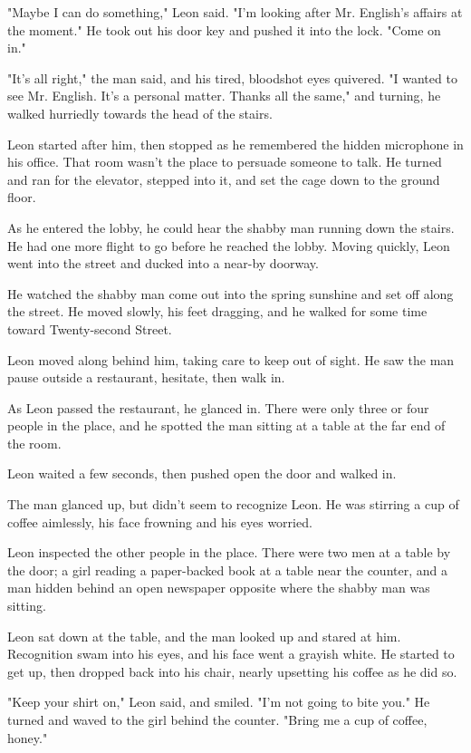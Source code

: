 \documentclass{novel}
\begin{document}
"Maybe I can do something," Leon said. "I'm looking after Mr. English's affairs at the moment." He took out his door key and pushed it into the lock. "Come on in."

"It's all right," the man said, and his tired, bloodshot eyes quivered. "I wanted to see Mr. English. It's a personal matter. Thanks all the same," and turning, he walked hurriedly towards the head of the stairs.

Leon started after him, then stopped as he remembered the hidden microphone in his office. That room wasn't the place to persuade someone to talk. He turned and ran for the elevator, stepped into it, and set the cage down to the ground floor.

As he entered the lobby, he could hear the shabby man running down the stairs. He had one more flight to go before he reached the lobby. Moving quickly, Leon went into the street and ducked into a near-by doorway.

He watched the shabby man come out into the spring sunshine and set off along the street. He moved slowly, his feet dragging, and he walked for some time toward Twenty-second Street.

Leon moved along behind him, taking care to keep out of sight. He saw the man pause outside a restaurant, hesitate, then walk in.

As Leon passed the restaurant, he glanced in. There were only three or four people in the place, and he spotted the man sitting at a table at the far end of the room.

Leon waited a few seconds, then pushed open the door and walked in.

The man glanced up, but didn't seem to recognize Leon. He was stirring a cup of coffee aimlessly, his face frowning and his eyes worried.

Leon inspected the other people in the place. There were two men at a table by the door; a girl reading a paper-backed book at a table near the counter, and a man hidden behind an open newspaper opposite where the shabby man was sitting.

Leon sat down at the table, and the man looked up and stared at him. Recognition swam into his eyes, and his face went a grayish white. He started to get up, then dropped back into his chair, nearly upsetting his coffee as he did so.

"Keep your shirt on," Leon said, and smiled. "I'm not going to bite you." He turned and waved to the girl behind the counter. "Bring me a cup of coffee, honey."
\end{document}
